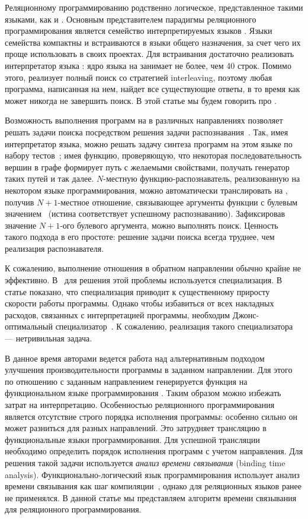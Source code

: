 \documentclass[conference]{IEEEtran}
\begin{document}
Реляционному программированию родственно логическое, представленное такими языками, как \prolog{} и \mercury{}.
Основным представителем парадигмы реляционного программирования является семейство интерпретируемых языков \miniKanren{}. 
Языки семейства \miniKanren{} компактны и встраиваются в языки общего назначения, за счет чего их проще использовать в своих проектах. 
Для встраивания достаточно реализовать интерпретатор языка \miniKanren{}: ядро языка на \scheme{} занимает не более, чем 40 строк. 
Помимо этого, \miniKanren{} реализует полный поиск со стратегией interleaving, поэтому любая программа, написанная на нем, найдет все существующие ответы, в то время как \prolog{} может никогда не завершить поиск. 
В этой статье мы будем говорить про \miniKanren{}.

Возможность выполнения программ на \miniKanren{} в различных направлениях позволяет решать задачи поиска посредством решения задачи распознавания~\cite{lozov2019relational}.
Так, имея интерпретатор языка, можно решать задачу синтеза программ на этом языке по набору тестов~\cite{byrd2017unified}; имея функцию, проверяющую, что некоторая последовательность вершин в графе формирует путь с желаемыми свойствами, получать генератор таких путей и так далее. 
$N$-местную функцию-распознаватель, реализованную на некотором языке программирования, можно автоматически транслировать на \miniKanren{}, получив $N+1$-местное отношение, связывающее аргументы функции с булевым значением~\cite{lozov2019relational} (истина соответствует успешному распознаванию). 
Зафиксировав значение $N+1$-ого булевого аргумента, можно выполнять поиск. 
Ценность такого подхода в его простоте: решение задачи поиска всегда труднее, чем реализация распознавателя. 

К сожалению, выполнение отношения в обратном направлении обычно крайне не эффективно. 
В~\cite{lozov2019relational} для решения этой проблемы используется специализация. 
В статье показано, что специализация приводит к существенному приросту скорости работы программы.
Однако чтобы избавиться от всех накладных расходов, связанных с интерпретацией программы, необходим Джонс-оптимальный специализатор~\cite{jones1993partial}. 
К сожалению, реализация такого специализатора --- нетривильная задача.

В данное время авторами ведется работа над альтернативным подходом улучшения производительности программы в заданном направлении. 
Для этого по отношению с заданным направлением генерируется функция на функциональном языке программирования \haskell{}. 
Таким образом можно избежать затрат на интерпретацию. 
Особенностью реляционного программирования является отсутствие строго порядка исполнения программы: особенно сильно он может разниться для разных направлений.
Это затрудняет трансляцию в функциональные языки программирования. 
Для успешной трансляции необходимо определить порядок исполнения программ с учетом направления. 
Для решения такой задачи используется \emph{анализ времени связывания} (binding time analysis). 
Функционально-логический язык программирования \mercury использует анализ времени связывания как шаг компиляции~\cite{vanhoof2004binding}, однако для реляционных языков ранее не применялся.
В данной статье мы представляем алгоритм времени связывания для реляционного программирования. 
\end{document}
